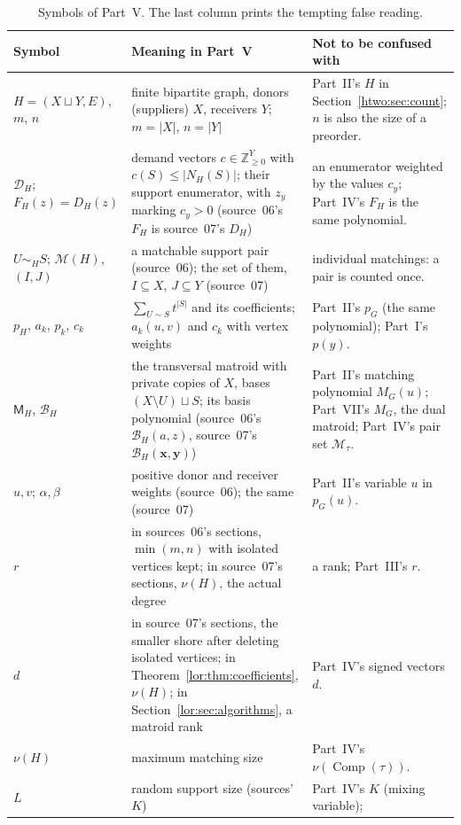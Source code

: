 \documentclass[11pt]{article}
\numberwithin{equation}{section}
\theoremstyle{definition}
\newcommand{\Z}{\mathbb Z}
\newcommand{\PM}{\mathcal M}
\newcommand{\Comp}{\operatorname{Comp}}
\newcommand{\cD}{\mathcal D}
\newcommand{\cB}{\mathcal B}
\begin{document}
\begin{table}[tbp]
\centering\footnotesize
\caption{Symbols of Part~V. The last column prints the tempting false
reading.}
\label{lor:tab:notation}
\begin{tabularx}{\textwidth}{@{}>{\raggedright}p{}>{\raggedright}p{}Y@{}}
\toprule
Symbol & Meaning in Part~V & Not to be confused with\\
\midrule
$H=(X\sqcup Y,E)$, $m$, $n$ & finite bipartite graph, donors (suppliers) $X$,
 receivers $Y$; $m=|X|$, $n=|Y|$ & Part~II's $H$ in Section~\ref{htwo:sec:count};
 $n$ is also the size of a preorder.\\
$\cD_H$; $F_H(z)=D_H(z)$ & demand vectors $c\in\Z_{\ge0}^Y$ with $c(S)\le|N_H(S)|$;
 their support enumerator, with $z_y$ marking $c_y>0$ (source~06's $F_H$ is
 source~07's $D_H$) & an enumerator weighted by the values $c_y$; Part~IV's
 $F_H$ is the same polynomial.\\
$U\sim_HS$; $\PM(H)$, $(I,J)$ & a matchable support pair (source~06); the set of
 them, $I\subseteq X$, $J\subseteq Y$ (source~07) & individual matchings: a
 pair is counted once.\\
$p_H$, $a_k$, $p_k$, $c_k$ & $\sum_{U\sim S}t^{|S|}$ and its coefficients;
 $a_k(u,v)$ and $c_k$ with vertex weights & Part~II's $p_G$ (the same
 polynomial); Part~I's $p(y)$.\\
$\mathsf M_H$, $\mathcal B_H$ & the transversal matroid with private
 copies of $X$, bases $(X\setminus U)\sqcup S$; its basis polynomial (source~06's
 $\mathcal B_H(a,z)$, source~07's $\cB_H(\mathbf x,\mathbf y)$) & Part~II's
 matching polynomial $M_G(u)$; Part~VII's $M_G$, the dual matroid;
 Part~IV's pair set $\mathscr M_\tau$.\\
$u,v$; $\alpha,\beta$ & positive donor and receiver weights (source~06);
 the same (source~07) & Part~II's variable $u$ in $p_G(u)$.\\
$r$ & in sources~06's sections, $\min(m,n)$ with isolated vertices kept; in
 source~07's sections, $\nu(H)$, the actual degree & a rank; Part~III's $r$.\\
$d$ & in source~07's sections, the smaller shore after deleting isolated
 vertices; in Theorem~\ref{lor:thm:coefficients}, $\nu(H)$; in
 Section~\ref{lor:sec:algorithms}, a matroid rank & Part~IV's signed vectors
 $d$.\\
$\nu(H)$ & maximum matching size & Part~IV's $\nu(\Comp(\tau))$.\\
$L$ & random support size (sources' $K$) & Part~IV's $K$ (mixing variable);

\end{tabularx}
\end{table}
\end{document}
